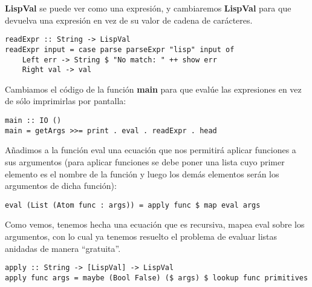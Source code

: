 \textbf{LispVal} se puede ver como una expresi\'on, y cambiaremos \textbf{LispVal} para que devuelva una expresi\'on en vez de su valor de cadena de car\'acteres.\\

\begin{minipage}{\linewidth}
\begin{small}
\begin{lstlisting}[frame=single]
readExpr :: String -> LispVal
readExpr input = case parse parseExpr "lisp" input of
    Left err -> String $ "No match: " ++ show err
    Right val -> val
\end{lstlisting}
\end{small}
\end{minipage}

Cambiamos el c\'odigo de la funci\'on \textbf{main} para que eval\'ue las expresiones en vez de s\'olo imprimirlas por pantalla:\\

\begin{minipage}{\linewidth}
\begin{small}
\begin{lstlisting}[frame=single]
main :: IO ()
main = getArgs >>= print . eval . readExpr . head
\end{lstlisting}
\end{small}
\end{minipage}

A\~nadimos a la funci\'on eval una ecuaci\'on que nos permitir\'a aplicar funciones a sus argumentos (para aplicar funciones se debe poner una lista cuyo primer elemento es el nombre de la funci\'on y luego los dem\'as elementos ser\'an los argumentos de dicha funci\'on):\\

\begin{minipage}{\linewidth}
\begin{small}
\begin{lstlisting}[frame=single]
eval (List (Atom func : args)) = apply func $ map eval args
\end{lstlisting}
\end{small}
\end{minipage}

Como vemos, tenemos hecha una ecuaci\'on que es recursiva, mapea eval sobre los argumentos, con lo cual ya tenemos resuelto el problema de evaluar listas anidadas de manera ``gratuita''.\\

\begin{minipage}{\linewidth}
\begin{footnotesize}
\begin{lstlisting}[frame=single]
apply :: String -> [LispVal] -> LispVal
apply func args = maybe (Bool False) ($ args) $ lookup func primitives
\end{lstlisting}
\end{footnotesize}
\end{minipage}


